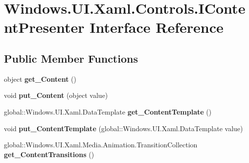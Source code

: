 \hypertarget{interface_windows_1_1_u_i_1_1_xaml_1_1_controls_1_1_i_content_presenter}{}\section{Windows.\+U\+I.\+Xaml.\+Controls.\+I\+Content\+Presenter Interface Reference}
\label{interface_windows_1_1_u_i_1_1_xaml_1_1_controls_1_1_i_content_presenter}
\subsection*{Public Member Functions}
\begin{DoxyCompactItemize}
\item 
\mbox{\label{interface_windows_1_1_u_i_1_1_xaml_1_1_controls_1_1_i_content_presenter_ae239eb9dcb8ffce9b1af514ec96d232c}} 
object {\bfseries get\+\_\+\+Content} ()
\item 
\mbox{\label{interface_windows_1_1_u_i_1_1_xaml_1_1_controls_1_1_i_content_presenter_a92a8239bd5d9c2deaf3a6901d4c33da6}} 
void {\bfseries put\+\_\+\+Content} (object value)
\item 
\mbox{\label{interface_windows_1_1_u_i_1_1_xaml_1_1_controls_1_1_i_content_presenter_a5ba47cb8cb89765bea45f2242ad31a45}} 
global\+::\+Windows.\+U\+I.\+Xaml.\+Data\+Template {\bfseries get\+\_\+\+Content\+Template} ()
\item 
\mbox{\label{interface_windows_1_1_u_i_1_1_xaml_1_1_controls_1_1_i_content_presenter_a74180212284ee21c083ea156f117cb3c}} 
void {\bfseries put\+\_\+\+Content\+Template} (global\+::\+Windows.\+U\+I.\+Xaml.\+Data\+Template value)
\item 
\mbox{\label{interface_windows_1_1_u_i_1_1_xaml_1_1_controls_1_1_i_content_presenter_a0db45f8a30518615e50e4f98e8bcc040}} 
global\+::\+Windows.\+U\+I.\+Xaml.\+Media.\+Animation.\+Transition\+Collection {\bfseries get\+\_\+\+Content\+Transitions} ()

\end{DoxyCompactItemize}
